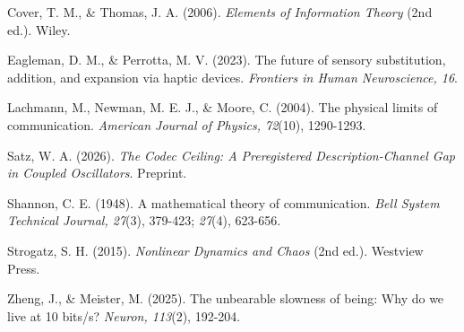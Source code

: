 \documentclass[
  11pt,
]{article}
\begin{document}
Cover, T. M., \& Thomas, J. A. (2006). \emph{Elements
of Information Theory} (2nd ed.). Wiley.

Eagleman, D. M., \& Perrotta, M. V. (2023). The future
of sensory substitution, addition, and expansion via
haptic devices. \emph{Frontiers in Human Neuroscience,
16}.

Lachmann, M., Newman, M. E. J., \& Moore, C. (2004).
The physical limits of communication. \emph{American
Journal of Physics, 72}(10), 1290-1293.

Satz, W. A. (2026). \emph{The Codec Ceiling: A
Preregistered Description-Channel Gap in Coupled
Oscillators}. Preprint.

Shannon, C. E. (1948). A mathematical theory of
communication. \emph{Bell System Technical Journal,
27}(3), 379-423; \emph{27}(4), 623-656.

Strogatz, S. H. (2015). \emph{Nonlinear Dynamics and
Chaos} (2nd ed.). Westview Press.

Zheng, J., \& Meister, M. (2025). The unbearable
slowness of being: Why do we live at 10 bits/s?
\emph{Neuron, 113}(2), 192-204.
\end{document}
